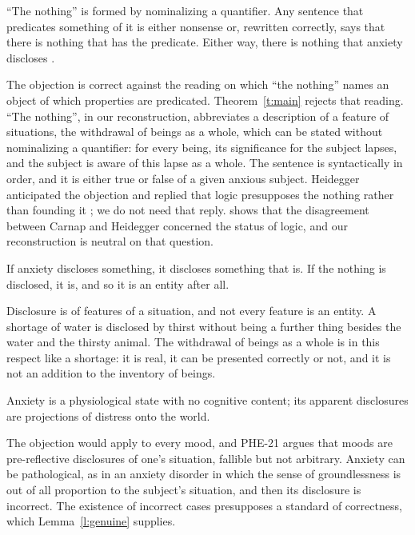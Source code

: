 \documentclass{situationist-preprint}
\begin{document}
\begin{objection}[Carnap]
\enquote{The nothing} is formed by nominalizing a quantifier. Any sentence that predicates something of it is either nonsense or, rewritten correctly, says that there is nothing that has the predicate. Either way, there is nothing that anxiety discloses \citep{Carnap1932}.
\end{objection}

\begin{reply}
The objection is correct against the reading on which \enquote{the nothing} names an object of which properties are predicated. Theorem~\ref{t:main} rejects that reading. \enquote{The nothing}, in our reconstruction, abbreviates a description of a feature of situations, the withdrawal of beings as a whole, which can be stated without nominalizing a quantifier: for every being, its significance for the subject lapses, and the subject is aware of this lapse as a whole. The sentence is syntactically in order, and it is either true or false of a given anxious subject. Heidegger anticipated the objection and replied that logic presupposes the nothing rather than founding it \citep{Heidegger1929}; we do not need that reply. \citet{Friedman2000} shows that the disagreement between Carnap and Heidegger concerned the status of logic, and our reconstruction is neutral on that question.
\end{reply}

\begin{objection}[Reification]
If anxiety discloses something, it discloses something that is. If the nothing is disclosed, it is, and so it is an entity after all.
\end{objection}

\begin{reply}
Disclosure is of features of a situation, and not every feature is an entity. A shortage of water is disclosed by thirst without being a further thing besides the water and the thirsty animal. The withdrawal of beings as a whole is in this respect like a shortage: it is real, it can be presented correctly or not, and it is not an addition to the inventory of beings.
\end{reply}

\begin{objection}
Anxiety is a physiological state with no cognitive content; its apparent disclosures are projections of distress onto the world.
\end{objection}

\begin{reply}
The objection would apply to every mood, and PHE-21 argues that moods are pre-reflective disclosures of one's situation, fallible but not arbitrary. Anxiety can be pathological, as in an anxiety disorder in which the sense of groundlessness is out of all proportion to the subject's situation, and then its disclosure is incorrect. The existence of incorrect cases presupposes a standard of correctness, which Lemma~\ref{l:genuine} supplies.
\end{reply}
\end{document}
